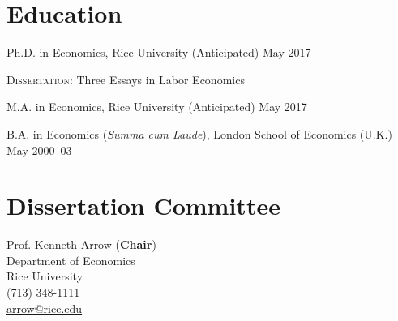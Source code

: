 \documentclass[11pt]{res} %
\newcommand{\forceindent}{\leavevmode{\parindent=24pt\indent}}
\begin{document}
\thispagestyle{empty}


\address{
\href{mailto:dricardo@rice.edu}{dricardo@rice.edu} \\
Department of Economics MS-22 \\
Rice University, Houston, TX 77251-1892\\
(713) 348-8411
}

\begin{resume}

\section{Education}
\vspace{6pt}

Ph.D. in Economics, Rice University  \hfill (Anticipated) May 2017 \par
\forceindent \textsc{Dissertation}: Three Essays in Labor Economics

M.A. in Economics, Rice University  \hfill (Anticipated) May 2017 \par

B.A. in Economics (\emph{Summa cum Laude}), London School of Economics (U.K.)  \hfill    May 2000--03 \par

\section{Dissertation Committee}
\vspace{6pt}

\forceindent
\begin{minipage}[t]{0.5\textwidth}
Prof. Kenneth Arrow (\textbf{Chair}) \\
Department of Economics \\
Rice University \\
(713) 348-1111\\
\href{mailto:arrow@rice.edu}{arrow@rice.edu}

\vspace{.4cm}


\end{minipage}
\end{resume}
\end{document}
